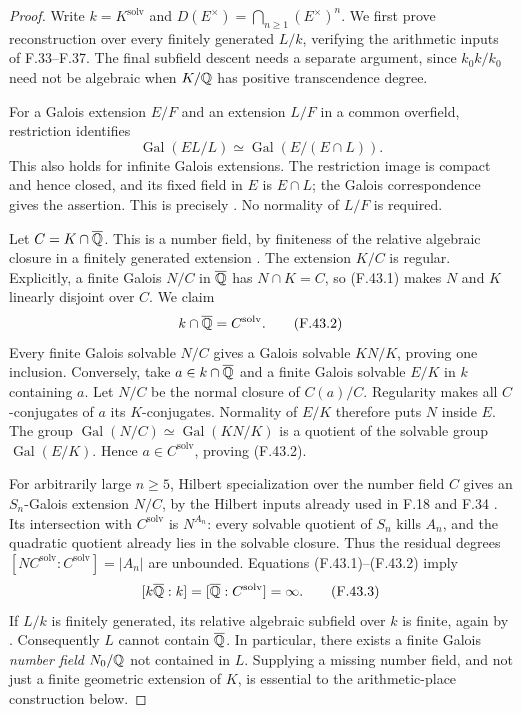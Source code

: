 \begin{proof}
Write $k=K^{\mathrm{solv}}$ and
$D(E^\times)=\bigcap_{n\ge1}(E^\times)^n$.
We first prove reconstruction over every finitely generated
$L/k$, verifying the arithmetic inputs of F.33--F.37.
The final subfield descent needs a separate argument, since
$k_0k/k_0$ need not be algebraic when $K/\mathbb Q$ has positive
transcendence degree.

For a Galois extension $E/F$ and an extension $L/F$ in a
common overfield, restriction identifies
\[
 \operatorname{Gal}(EL/L)
       \simeq\operatorname{Gal}(E/(E\cap L)).                 \tag{F.43.1}
\]
This also holds for infinite Galois extensions. The
restriction image is compact and hence closed, and its
fixed field in $E$ is $E\cap L$; the Galois correspondence
gives the assertion. This is precisely
\citet[Proposition~7.15 and Corollary~7.16, p.~99]{F_MilneFT2022}.
No normality of $L/F$ is required.

Let $C=K\cap\overline{\mathbb Q}$. This is a number field, by
finiteness of the relative algebraic closure in a finitely
generated extension \citep[Lemma~9.26.11]{F_StacksFields}.
The extension $K/C$ is regular. Explicitly, a finite Galois
$N/C$ in $\overline{\mathbb Q}$ has $N\cap K=C$, so (F.43.1)
makes $N$ and $K$ linearly disjoint over $C$. We claim
\[
              k\cap\overline{\mathbb Q}=C^{\mathrm{solv}}.           \tag{F.43.2}
\]
Every finite Galois solvable $N/C$ gives a Galois solvable
$KN/K$, proving one inclusion. Conversely, take
$a\in k\cap\overline{\mathbb Q}$ and a finite Galois solvable
$E/K$ in $k$ containing $a$. Let $N/C$ be the normal
closure of $C(a)/C$. Regularity makes all $C$-conjugates
of $a$ its $K$-conjugates. Normality of $E/K$ therefore
puts $N$ inside $E$. The group
$\operatorname{Gal}(N/C)\simeq\operatorname{Gal}(KN/K)$
is a quotient of the solvable group
$\operatorname{Gal}(E/K)$. Hence $a\in C^{\mathrm{solv}}$,
proving (F.43.2).

For arbitrarily large $n\ge5$, Hilbert specialization over
the number field $C$ gives an $S_n$-Galois extension $N/C$,
by the Hilbert inputs already used in F.18 and F.34
\citep[Corollary~3.2.2, Proposition~3.3.1 and
Theorem~3.4.1]{F_Serre2007}. Its intersection with
$C^{\mathrm{solv}}$ is $N^{A_n}$: every solvable quotient
of $S_n$ kills $A_n$, and the quadratic quotient already
lies in the solvable closure. Thus the residual degrees
$[NC^{\mathrm{solv}}:C^{\mathrm{solv}}]=|A_n|$ are
unbounded. Equations (F.43.1)--(F.43.2) imply
\[
 [k\overline{\mathbb Q}:k]
       =[\overline{\mathbb Q}:C^{\mathrm{solv}}]=\infty.             \tag{F.43.3}
\]
If $L/k$ is finitely generated, its relative algebraic
subfield over $k$ is finite, again by
\citet[Lemma~9.26.11]{F_StacksFields}. Consequently $L$
cannot contain $\overline{\mathbb Q}$. In particular, there
exists a finite Galois \emph{number field} $N_0/\mathbb Q$
not contained in $L$. Supplying a missing number field,
and not just a finite geometric extension of $K$, is
essential to the arithmetic-place construction below.


\end{proof}
